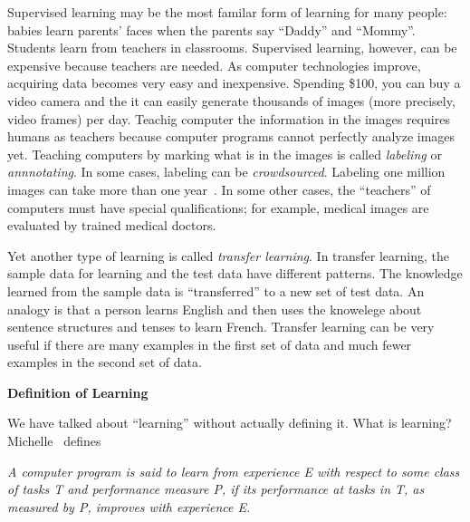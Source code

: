 Supervised learning may be the most familar form of learning for many
people: babies learn parents' faces when the parents say ``Daddy'' and
``Mommy''.  Students learn from teachers in classrooms.  Supervised
learning, however, can be expensive because teachers are needed.  As
computer technologies improve, acquiring data becomes very easy and
inexpensive.  Spending \$100, you can buy a video camera and the it
can easily generate thousands of images (more precisely, video frames)
per day. Teachig computer the information in the images requires
humans as teachers because computer programs cannot perfectly analyze
images yet.  Teaching computers by marking what is in the images is
called {\it labeling} or {\it annnotating}.  In some cases, labeling
can be {\it crowdsourced}.  Labeling one million images can take more
than one year~\cite{imagenet}.   In some other
cases, the ``teachers'' of computers must have special qualifications;
for example, medical images are evaluated by trained medical doctors.


Yet another type of learning is called {\it transfer learning}.  In
transfer learning, the sample data for learning and the test data have
different patterns.  The knowledge learned from the sample data is
``transferred'' to a new set of test data.  An analogy is that a
person learns English and then uses the knowelege about sentence
structures and tenses to learn French. Transfer learning can be very
useful if there are many examples in the first set of data and much
fewer examples in the second set of data.


\begin{comment}
http://incompleteideas.net/book/bookdraft2017nov5.pdf
Reinforcement Learning: An Introduction
Richard S. Sutton and Andrew G. Barto
\end{comment}



    {\bf Definition of Learning}

  We have talked about ``learning'' without actually defining it.
  What is learning? Michelle~\cite{Mitchell1997MachineLearning}
  defines

  
  
  {\it
    A computer program is said to learn from experience E with respect
    to some class of tasks T and performance measure P, if its
    performance at tasks in T, as measured by P, improves with
    experience E.}

